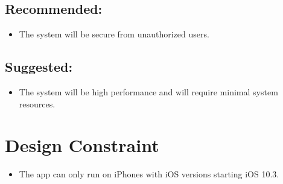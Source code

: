 \subsection{Recommended:}
\begin{itemize}
\item The system will be secure from unauthorized users. 
 \end{itemize}
 
\subsection{Suggested:}
\begin{itemize}
\item The system will be high performance and will require minimal system resources.
 \end{itemize}
\section{Design Constraint}
\begin{itemize}
\item The app can only run on iPhones with iOS versions starting iOS  10.3.
 \end{itemize}
